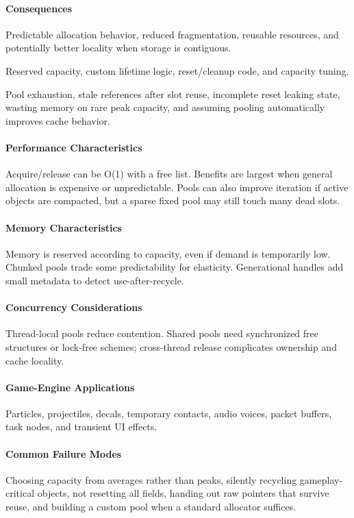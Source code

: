 \documentclass[11pt]{article}
\begin{document}
\paragraph{Consequences}
\begin{description}[leftmargin=2.7cm,style=nextline]
\item[Benefits] Predictable allocation behavior, reduced fragmentation, reusable resources, and potentially better locality when storage is contiguous.
\item[Costs] Reserved capacity, custom lifetime logic, reset/cleanup code, and capacity tuning.
\item[Risks] Pool exhaustion, stale references after slot reuse, incomplete reset leaking state, wasting memory on rare peak capacity, and assuming pooling automatically improves cache behavior.
\end{description}
\paragraph{Performance Characteristics} Acquire/release can be O(1) with a free list. Benefits are largest when general allocation is expensive or unpredictable. Pools can also improve iteration if active objects are compacted, but a sparse fixed pool may still touch many dead slots.
\paragraph{Memory Characteristics} Memory is reserved according to capacity, even if demand is temporarily low. Chunked pools trade some predictability for elasticity. Generational handles add small metadata to detect use-after-recycle.
\paragraph{Concurrency Considerations} Thread-local pools reduce contention. Shared pools need synchronized free structures or lock-free schemes; cross-thread release complicates ownership and cache locality.
\paragraph{Game-Engine Applications} Particles, projectiles, decals, temporary contacts, audio voices, packet buffers, task nodes, and transient UI effects.
\paragraph{Common Failure Modes} Choosing capacity from averages rather than peaks, silently recycling gameplay-critical objects, not resetting all fields, handing out raw pointers that survive reuse, and building a custom pool when a standard allocator suffices.
\end{document}
